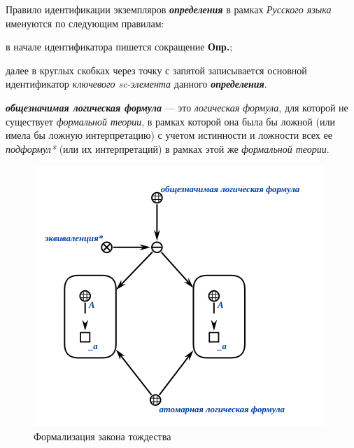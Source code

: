 Правило идентификации экземпляров \textbf{\textit{определения}} в рамках \textit{Русского языка} именуются по следующим правилам:
\begin{textitemize}
	\item{в начале идентификатора пишется сокращение \textbf{Опр.};}
	\item{далее в круглых скобках через точку с запятой записывается основной идентификатор  \textit{ключевого sc-элемента\scnrolesign} данного \textbf{\textit{определения}}.}
\end{textitemize}


\begin{SCn}
\end{SCn}
\textbf{\textit{общезначимая логическая формула}} --- это \textit{логическая формула}, для которой не существует \textit{формальной теории}, в рамках которой она была бы ложной (или имела бы ложную интерпретацию) с учетом истинности и ложности всех ее \textit{подформул*} (или их интерпретаций) в рамках этой же \textit{формальной теории}.

\begin{figure}[H]
\includegraphics[scale=0.8]{author/part2/figures/logic/valid_formula.png}
\caption{Формализация закона тождества}
\label{fig:valid_formula}
\end{figure}

